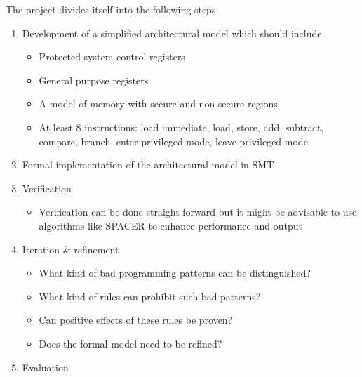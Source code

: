 \documentclass{securem}
\begin{document}
The project divides itself into the following steps:
\begin{enumerate}
    \item Development of a simplified architectural model which should include
    \begin{itemize}
        \item Protected system control registers
        \item General purpose registers
        \item A model of memory with secure and non-secure regions
        \item At least 8 instructions: load immediate, load, store, add, subtract, compare, branch, enter privileged mode, leave privileged mode
    \end{itemize}
    \item Formal implementation of the architectural model in SMT
    \item Verification
    \begin{itemize}
        \item Verification can be done straight-forward but it might be advisable to use algorithms like SPACER to enhance performance and output
    \end{itemize}
    \item Iteration \& refinement
    \begin{itemize}
        \item What kind of bad programming patterns can be distinguished?
        \item What kind of rules can prohibit such bad patterns?
        \item Can positive effects of these rules be proven?
        \item Does the formal model need to be refined?
    \end{itemize}
    \item Evaluation
\end{enumerate}



\end{document}
